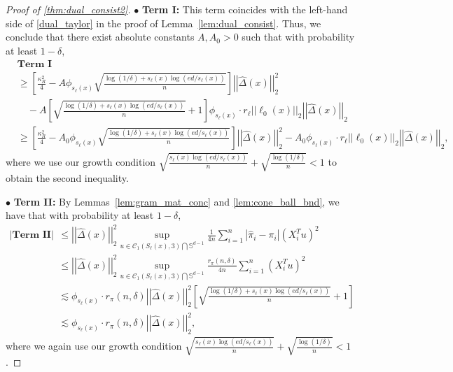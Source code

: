 \documentclass[ejsv2,noshowframe]{imsart}
\theoremstyle{plain}
\theoremstyle{definition}
\theoremstyle{remark}
\newcommand{\norm}[1]{\left|\left| #1 \right|\right|}
\renewcommand{\hat}{\widehat}
\begin{document}
\begin{proof}[Proof of \autoref{thm:dual_consist2}]
	$\bullet$ {\bf Term I:} This term coincides with the left-hand side of \eqref{dual_taylor} in the proof of Lemma~\ref{lem:dual_consist}. Thus, we conclude that there exist absolute constants $A,A_0>0$ such that with probability at least $1-\delta$, 
	\begin{align*}
		&\textbf{Term I} \\
		&\geq \left[\frac{\kappa_R^2}{4} - A\phi_{s_{\ell}(x)} \sqrt{\frac{\log(1/\delta)+s_{\ell}(x)\log(ed/s_{\ell}(x))}{n}} \right]\norm{\hat{\Delta}(x)}_2^2 \\
		&\quad - A\left[\sqrt{\frac{\log(1/\delta)+s_{\ell}(x)\log(ed/s_{\ell}(x))}{n}} + 1\right]\phi_{s_{\ell}(x)} \cdot r_{\ell} \norm{\ell_0(x)}_2\norm{\hat{\Delta}(x)}_2\\
		&\geq \left[\frac{\kappa_R^2}{4} - A_0\phi_{s_{\ell}(x)} \sqrt{\frac{\log(1/\delta)+s_{\ell}(x)\log(ed/s_{\ell}(x))}{n}} \right]\norm{\hat{\Delta}(x)}_2^2 - A_0 \phi_{s_{\ell}(x)} \cdot r_{\ell} \norm{\ell_0(x)}_2\norm{\hat{\Delta}(x)}_2,
	\end{align*}
	where we use our growth condition $\sqrt{\frac{s_{\ell}(x)\log(ed/s_{\ell}(x))}{n}} + \sqrt{\frac{\log(1/\delta)}{n}} < 1$ to obtain the second inequality.
	
	$\bullet$ {\bf Term II:} By Lemmas~\ref{lem:gram_mat_conc} and \ref{lem:cone_ball_bnd}, we have that with probability at least $1-\delta$,
	\begin{align*}
		\left|\textbf{Term II}\right| &\leq \norm{\hat{\Delta}(x)}_2^2 \sup_{u \in \mathcal{C}_1(S_{\ell}(x),3) \bigcap \mathbb{S}^{d-1}} \frac{1}{4n} \sum_{i=1}^n \left|\hat{\pi}_i - \pi_i\right| \left(X_i^T u\right)^2\\
		&\leq \norm{\hat{\Delta}(x)}_2^2 \sup_{u \in \mathcal{C}_1(S_{\ell}(x),3) \bigcap \mathbb{S}^{d-1}} \frac{r_{\pi}(n,\delta)}{4n} \sum_{i=1}^n  \left(X_i^T u\right)^2 \\
		&\lesssim \phi_{s_{\ell}(x)} \cdot r_{\pi}(n,\delta) \norm{\hat{\Delta}(x)}_2^2 \left[\sqrt{\frac{\log(1/\delta)+s_{\ell}(x)\log(ed/s_{\ell}(x))}{n}} + 1\right]\\
		&\lesssim \phi_{s_{\ell}(x)} \cdot r_{\pi}(n,\delta) \norm{\hat{\Delta}(x)}_2^2,
	\end{align*}
	where we again use our growth condition $\sqrt{\frac{s_{\ell}(x)\log(ed/s_{\ell}(x))}{n}} + \sqrt{\frac{\log(1/\delta)}{n}} < 1$.
	

\end{proof}
\end{document}

